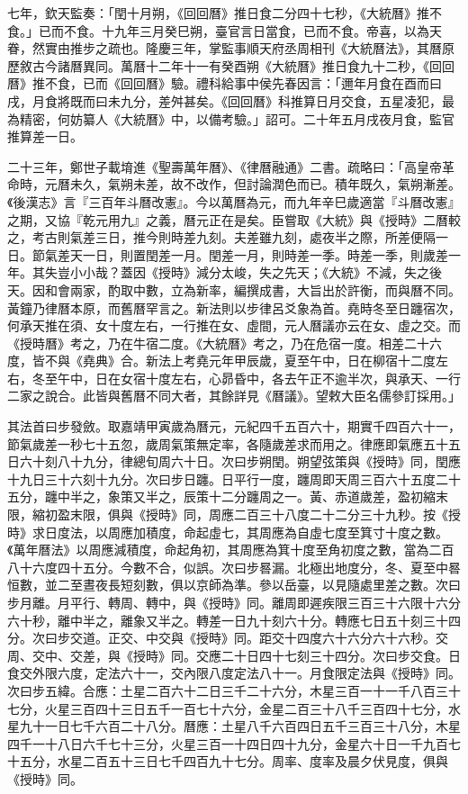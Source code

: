七年，欽天監奏：「閏十月朔，《回回曆》推日食二分四十七秒，《大統曆》推不食。」已而不食。十九年三月癸巳朔，臺官言日當食，已而不食。帝喜，以為天眷，然實由推步之疏也。隆慶三年，掌監事順天府丞周相刊《大統曆法》，其曆原歷敘古今諸曆異同。萬曆十二年十一有癸酉朔《大統曆》推日食九十二秒，《回回曆》推不食，已而《回回曆》驗。禮科給事中侯先春因言：「邇年月食在酉而曰戌，月食將既而曰未九分，差舛甚矣。《回回曆》科推算日月交食，五星凌犯，最為精密，何妨纂人《大統曆》中，以備考驗。」詔可。二十年五月戌夜月食，監官推算差一日。

二十三年，鄭世子載堉進《聖壽萬年曆》、《律曆融通》二書。疏略曰：「高皇帝革命時，元曆未久，氣朔未差，故不改作，但討論潤色而已。積年既久，氣朔漸差。《後漢志》言『三百年斗曆改憲』。今以萬曆為元，而九年辛巳歲適當『斗曆改憲』之期，又協『乾元用九』之義，曆元正在是矣。臣嘗取《大統》與《授時》二曆較之，考古則氣差三日，推今則時差九刻。夫差雖九刻，處夜半之際，所差便隔一日。節氣差天一日，則置閏差一月。閏差一月，則時差一季。時差一季，則歲差一年。其失豈小小哉？蓋因《授時》減分太峻，失之先天；《大統》不減，失之後天。因和會兩家，酌取中數，立為新率，編撰成書，大旨出於許衡，而與曆不同。黃鐘乃律曆本原，而舊曆罕言之。新法則以步律呂爻象為首。堯時冬至日躔宿次，何承天推在須、女十度左右，一行推在女、虛間，元人曆議亦云在女、虛之交。而《授時曆》考之，乃在牛宿二度。《大統曆》考之，乃在危宿一度。相差二十六度，皆不與《堯典》合。新法上考堯元年甲辰歲，夏至午中，日在柳宿十二度左右，冬至午中，日在女宿十度左右，心昴昏中，各去午正不逾半次，與承天、一行二家之說合。此皆與舊曆不同大者，其餘詳見《曆議》。望敕大臣名儒參訂採用。」

其法首曰步發斂。取嘉靖甲寅歲為曆元，元紀四千五百六十，期實千四百六十一，節氣歲差一秒七十五忽，歲周氣策無定率，各隨歲差求而用之。律應即氣應五十五日六十刻八十九分，律總旬周六十日。次曰步朔閏。朔望弦策與《授時》同，閏應十九日三十六刻十九分。次曰步日躔。日平行一度，躔周即天周三百六十五度二十五分，躔中半之，象策又半之，辰策十二分躔周之一。黃、赤道歲差，盈初縮末限，縮初盈末限，俱與《授時》同，周應二百三十八度二十二分三十九秒。按《授時》求日度法，以周應加積度，命起虛七，其周應為自虛七度至箕寸十度之數。《萬年曆法》以周應減積度，命起角初，其周應為箕十度至角初度之數，當為二百八十六度四十五分。今數不合，似誤。次曰步晷漏。北極出地度分，冬、夏至中晷恒數，並二至晝夜長短刻數，俱以京師為準。參以岳臺，以見隨處里差之數。次曰步月離。月平行、轉周、轉中，與《授時》同。離周即遲疾限三百三十六限十六分六十秒，離中半之，離象又半之。轉差一日九十刻六十分。轉應七日五十刻三十四分。次曰步交道。正交、中交與《授時》同。距交十四度六十六分六十六秒。交周、交中、交差，與《授時》同。交應二十日四十七刻三十四分。次曰步交食。日食交外限六度，定法六十一，交內限八度定法八十一。月食限定法與《授時》同。次曰步五緯。合應：土星二百六十二日三千二十六分，木星三百一十一千八百三十七分，火星三百四十三日五千一百七十六分，金星二百三十八千三百四十七分，水星九十一日七千六百二十八分。曆應：土星八千六百四日五千三百三十八分，木星四千一十八日六千七十三分，火星三百一十四日四十九分，金星六十日一千九百七十五分，水星二百五十三日七千四百九十七分。周率、度率及晨夕伏見度，俱與《授時》同。

